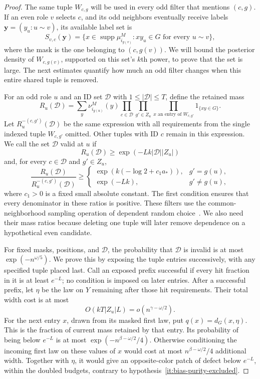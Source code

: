\begin{proof}
The same tuple \(W_{c,g}\) will be used in every odd filter that mentions
\((c,g)\). If an even role \(v\) selects \(c\), and its odd neighbors
eventually receive labels \(\mathbf y=(y_u:u\sim v)\), its available
label set is
\[
 S_{v,c}(\mathbf y)=
 \{x\in\operatorname{supp}\mu_{i_{g(v)}}^M:
                         xy_u\in G\text{ for every }u\sim v\},
\]
where the mask is the one belonging to \((c,g(v))\). We will bound the
posterior density of \(W_{c,g(v)}\), supported on this set's \(k\)th
power, to prove that the set is large. The next estimates quantify how
much an odd filter changes when this entire shared tuple is removed.

For an odd role \(u\) and an ID set \(\mathcal D\) with
\(1\le|\mathcal D|\le T\), define the retained mass
\[
 R_u(\mathcal D)=\sum_y\nu_{i_{g(u)}}^M(y)
       \prod_{c\in\mathcal D}\prod_{g'\in Z_u}
       \prod_{x\text{ an entry of }W_{c,g'}}1_{\{xy\in G\}}.
\]
Let \(R_u^{-(c,g')}(\mathcal D)\) be the same expression with all
requirements from the single indexed tuple \(W_{c,g'}\) omitted.
Other tuples with ID \(c\) remain in this expression. We call the set
\(\mathcal D\) valid at \(u\) if
\[
 R_u(\mathcal D)\ge\exp(-Lk|\mathcal D||Z_u|)
\]
and, for every \(c\in\mathcal D\) and \(g'\in Z_u\),
\[
 \frac{R_u(\mathcal D)}{R_u^{-(c,g')}(\mathcal D)}\ge
 \begin{cases}
 \exp(k(-\log2+c_1a_*)),&g'=g(u),\\
 \exp(-Lk),&g'\ne g(u),
 \end{cases}
\]
where \(c_1>0\) is a fixed small absolute constant. The first condition
ensures that every denominator in these ratios is positive. These
filters use the common-neighborhood sampling operation of dependent
random choice~\cite[Lemma~2.1]{fox-sudakov2009}. We also need their mass
ratios because deleting one tuple will later remove dependence on a
hypothetical even candidate.

For fixed masks, positions, and \(\mathcal D\), the probability that
\(\mathcal D\) is invalid is at most \(\exp(-n^{\omega/5})\). We prove
this by exposing the tuple entries successively, with any specified
tuple placed last. Call an exposed prefix successful if every hit
fraction in it is at least \(e^{-L}\); no condition is imposed on later
entries. After a successful prefix, let \(\eta\) be the law on \(Y\)
remaining after those hit requirements. Their total width cost is at most
\[
 O(kT|Z_u|L)=o(n^{\gamma-\omega/2}).
\]
For the next entry \(x\), drawn from its masked first law, put
\(q(x)=d_G(x,\eta)\). This is the fraction of current mass retained by
that entry. Its probability of being below \(e^{-L}\) is at most
\(\exp(-n^{\beta-\omega/2}/4)\). Otherwise conditioning the incoming
first law on these values of \(x\) would cost at most
\(n^{\beta-\omega/2}/4\) additional width. Together with \(\eta\), it
would give an opposite-color patch of defect below \(e^{-L}\), within
the doubled budgets, contrary to hypothesis~\ref{it:bias-purity-excluded}.


\end{proof}
